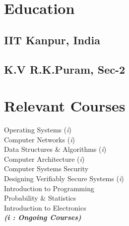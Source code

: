 \documentclass[]{deedy-resume-openfont}
\begin{document}
\begin{minipage}[t]{0.30\textwidth}

\vspace{-0.5cm}
\section{Education}

\subsection{IIT Kanpur, India}
\sectionsep{}

\subsection{K.V R.K.Puram, Sec-2}
\sectionsep{}
%


\section{Relevant Courses}
Operating Systems (\textit{i}) \\
Computer Networks (\textit{i}) \\
Data Structures \& Algorithms (\textit{i}) \\
Computer Architecture (\textit{i}) \\
Computer Systems Security \\
Designing Verifiably Secure Systems (\textit{i}) \\
Introduction to Programming \\
Probability \& Statistics \\
Introduction to Electronics \\


{\footnotesize \textit{\textbf{ (i : Ongoing Courses)}}}


\vspace{0.2cm}

\end{minipage}
\end{document}
